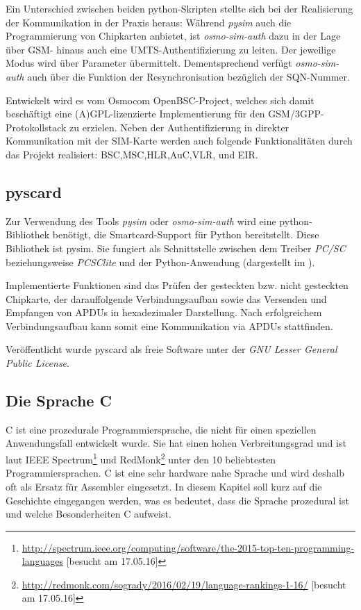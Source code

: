 Ein Unterschied zwischen beiden python-Skripten stellte sich bei der
Realisierung der Kommunikation in der Praxis heraus:
Während \textit{pysim} auch die Programmierung von Chipkarten anbietet, ist
\textit{osmo-sim-auth} dazu in der Lage über \ac{GSM}- hinaus auch
eine \ac{UMTS}-Authentifizierung zu leiten.
Der jeweilige Modus wird über Parameter übermittelt.
Dementsprechend verfügt \textit{osmo-sim-auth} auch über die Funktion der
Resynchronisation bezüglich der \ac{SQN}-Nummer\cite{osmosimweb}.

Entwickelt wird es vom Osmocom OpenBSC-Project, welches sich damit
beschäftigt eine (A)GPL-lizenzierte Implementierung für den
GSM/3GPP-Protokollstack zu erzielen. Neben der Authentifizierung
in direkter Kommunikation mit der SIM-Karte werden auch folgende
Funktionalitäten durch das Projekt realisiert:
\ac{BSC},\ac{MSC},\ac{HLR},\ac{AuC},\ac{VLR}, und \ac{EIR}\cite{osmocombscweb}.

\subsection{pyscard}
\label{pyscard}
Zur Verwendung des Tools \textit{pysim} oder \textit{osmo-sim-auth} wird eine python-Bibliothek benötigt,
die Smartcard-Support für Python bereitstellt. Diese Bibliothek
ist pysim. Sie fungiert als Schnittstelle zwischen dem Treiber \textit{PC/SC}
beziehungsweise \textit{PCSClite} und der Python-Anwendung 
(dargestellt im ).

Implementierte Funktionen sind das Prüfen der gesteckten bzw. nicht gesteckten
Chipkarte, der darauffolgende Verbindungsaufbau sowie das Versenden und
Empfangen von APDUs in hexadezimaler Darstellung.
Nach erfolgreichem Verbindungsaufbau kann somit eine Kommunikation via
APDUs stattfinden.

Veröffentlicht wurde pyscard als freie Software unter der
\textit{GNU Lesser General Public License}.

\subsection{Die Sprache C}
 C ist eine prozedurale Programmiersprache, die nicht für einen speziellen
 Anwendungsfall entwickelt wurde. Sie hat einen hohen Verbreitungsgrad
 und ist laut \ac{IEEE} Spectrum\footnote{\url{http://spectrum.ieee.org/computing/software/the-2015-top-ten-programming-languages} [besucht am 17.05.16]}
 und RedMonk\footnote{\url{http://redmonk.com/sogrady/2016/02/19/language-rankings-1-16/} [besucht am 17.05.16]}
 unter den 10 beliebtesten Programmier\-sprachen. C ist eine sehr hardware\-
 nahe Sprache und wird deshalb oft als Ersatz für Assembler eingesetzt. In
 diesem Kapitel soll kurz auf die Geschichte eingegangen werden, was es
 bedeutet, dass die Sprache prozedural ist und welche Besonderheiten C
 aufweist.

